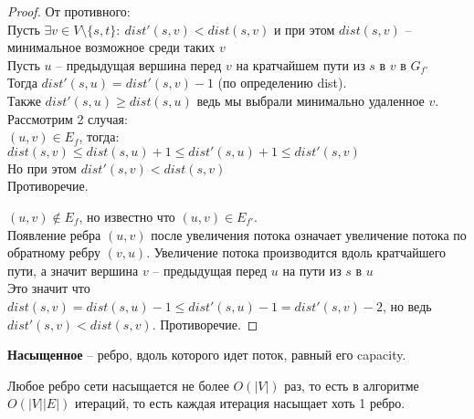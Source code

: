 \begin{proof} От противного: \\
	Пусть $\exists v \in V \setminus \{s, t\}:\ dist'(s, v) < dist(s, v)$ и при этом $dist(s, v)$ -- минимальное возможное среди таких $v$ \\
	Пусть $u$ -- предыдущая вершина перед  $v$	на кратчайшем пути из $s$ в  $v$ в $G_{f'}$ \\
	Тогда $dist'(s, u) = dist'(s, v) - 1$ (по определению dist). \\
	Также $dist'(s,u) \geq dist(s, u)$ ведь мы выбрали минимально удаленное $v$.\\
	Рассмотрим 2 случая: \\
		$(u, v) \in E_f$, тогда: \\
			$dist(s, v) \leq dist(s, u) + 1 \leq dist'(s, u) + 1 \leq dist'(s, v)$ \\
			Но при этом $dist'(s, v) < dist(s, v)$ \\
			Противоречие.
		
			$(u, v) \notin E_f$, но известно что $(u, v) \in E_{f'}$.\\
			Появление ребра $(u,v)$ после увеличения потока означает увеличение потока по обратному ребру $(v,u)$. Увеличение потока производится вдоль кратчайшего пути, а значит вершина  $v$ -- предыдущая перед  $u$ на пути из  $s$ в  $u$\\
			Это значит что  $dist(s, v) = dist(s, u) - 1 \leq dist'(s, u) - 1 = dist'(s, v) - 2$, но ведь $dist'(s, v) < dist(s, v)$. Противоречие.

\end{proof}

\begin{Def}
	\textbf{Насыщенное} -- ребро, вдоль которого идет поток, равный его capacity.
\end{Def}

\begin{lemma}
	Любое ребро сети насыщается не более $O(\lvert V \rvert)$ раз, то есть в алгоритме $O(\lvert V \rvert \lvert E \rvert)$ итераций, то есть каждая итерация насыщает хоть 1 ребро.
\end{lemma}

